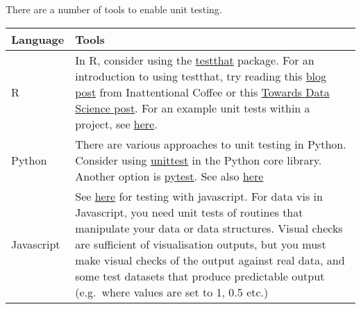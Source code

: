 \documentclass[]{book}
\begin{document}
There are a number of tools to enable unit testing.

\begin{longtable}[]{@{}ll@{}}
\toprule
\begin{minipage}[b]{0.21\columnwidth}\raggedright
Language\strut
\end{minipage} & \begin{minipage}[b]{0.73\columnwidth}\raggedright
Tools\strut
\end{minipage}\tabularnewline
\midrule
\endhead
\begin{minipage}[t]{0.21\columnwidth}\raggedright
R\strut
\end{minipage} & \begin{minipage}[t]{0.73\columnwidth}\raggedright
In R, consider using the \href{https://github.com/r-lib/testthat}{testthat} package. For an introduction to using testthat, try reading this \href{https://katherinemwood.github.io/post/testthat/}{blog post} from Inattentional Coffee or this \href{https://towardsdatascience.com/unit-testing-in-r-68ab9cc8d211}{Towards Data Science post}. For an example unit tests within a project, see \href{https://github.com/RobinL/costmodelr/tree/master/tests}{here}.\strut
\end{minipage}\tabularnewline
\begin{minipage}[t]{0.21\columnwidth}\raggedright
Python\strut
\end{minipage} & \begin{minipage}[t]{0.73\columnwidth}\raggedright
There are various approaches to unit testing in Python. Consider using \href{https://docs.python.org/3/library/unittest.html}{unittest} in the Python core library. Another option is \href{https://docs.pytest.org/en/latest/}{pytest}. See also \href{http://python-guide-pt-br.readthedocs.io/en/latest/writing/tests/}{here}\strut
\end{minipage}\tabularnewline
\begin{minipage}[t]{0.21\columnwidth}\raggedright
Javascript\strut
\end{minipage} & \begin{minipage}[t]{0.73\columnwidth}\raggedright
See \href{http://busypeoples.github.io/post/testing-d3-with-jasmine/}{here} for testing with javascript. For data vis in Javascript, you need unit tests of routines that manipulate your data or data structures. Visual checks are sufficient of visualisation outputs, but you must make visual checks of the output against real data, and some test datasets that produce predictable output (e.g.~where values are set to 1, 0.5 etc.)\strut
\end{minipage}\tabularnewline
\bottomrule
\end{longtable}
\end{document}
